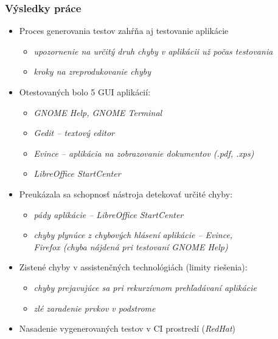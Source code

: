 \documentclass[10pt,xcolor=pdflatex,hyperref={unicode}]{beamer}
\begin{document}
\begin{frame}[fragile]\frametitle{Výsledky práce}
 
 \begin{itemize}
 \item Proces generovania testov zahŕňa aj testovanie aplikácie
    \begin{itemize}
    \item \emph{upozornenie na určitý druh chyby v aplikácii už počas testovania}
    \item \emph{kroky na zreprodukovanie chyby}
    \end{itemize}
\vspace{2mm}
\item Otestovaných bolo 5 GUI aplikácií:
\begin{itemize}
    \item \emph{GNOME Help, GNOME Terminal}
    \item \emph{Gedit -- textový editor}
    \item \emph{Evince -- aplikácia na zobrazovanie dokumentov (\textit{.pdf, .xps})}
    \item \emph{LibreOffice StartCenter}
\end{itemize}
\vspace{2mm}
\item Preukázala sa schopnosť nástroja detekovať určité chyby:
\begin{itemize}
    \item \emph{pády aplikácie -- LibreOffice StartCenter}
    \item \emph{chyby plynúce z chybových hlásení aplikácie -- Evince, \\ Firefox (chyba nájdená pri testovaní GNOME Help)}
\end{itemize}
\vspace{2mm}
\item Zistené chyby v assistenčných technológiách (limity riešenia):
\begin{itemize}
    \item \emph{chyby prejavujúce sa pri rekurzívnom prehľadávaní aplikácie}
    \item \emph{zlé zaradenie prvkov v podstrome}
\end{itemize}
\vspace{2mm}
\item Nasadenie vygenerovaných testov v CI prostredí (\textit{RedHat})

\end{itemize}

\end{frame}
\end{document}
